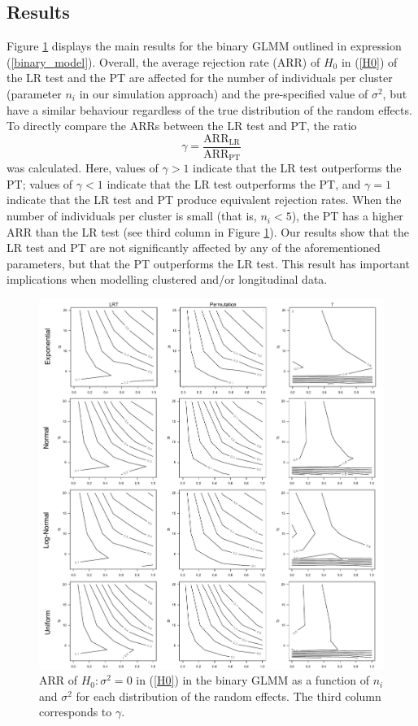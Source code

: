 \documentclass{sciposter}
\begin{document}
\begin{boldmath}
\begin{multicols}{3}
\section{Results}
Figure \ref{results} displays the main results for the binary GLMM outlined in expression (\ref{binary_model}). Overall, the average rejection rate (ARR) of $H_0$ in (\ref{H0}) of the LR test and the PT are affected for the number of individuals per cluster (parameter $n_i$ in our simulation approach) and the pre-specified value of $\sigma^2$, but have a similar behaviour regardless of the true distribution of the random effects. To directly compare the ARRs between the LR test and PT, the ratio
\begin{equation}
\gamma=\frac{\text{ARR}_{\text{LR}}}{\text{ARR}_{\text{PT}}}
\end{equation}
was calculated.  Here, values of $\gamma>1$ indicate that the LR test outperforms the PT; values of $\gamma<1$ indicate that the LR test outperforms the PT, and $\gamma=1$ indicate that the LR test and PT produce equivalent rejection rates. When the number of individuals per cluster is small (that is, $n_i<5$), the PT has a higher ARR than the LR test (see third column in Figure \ref{results}). Our results show that the LR test and PT are not significantly affected by any of the aforementioned parameters, but that the PT outperforms the LR test. This result has important implications when modelling clustered and/or longitudinal data.

\begin{figure}[htb]
  \centering
  \includegraphics[scale=1.24]{resbinary.pdf}
  \caption{ARR of $H_0:\sigma^2=0$ in (\ref{H0}) in the binary GLMM as  a function of $n_i$ and $\sigma^2$ for each distribution of the random effects.  The third column corresponds to $\gamma$.}\label{results}
\end{figure}

\end{multicols}
\end{boldmath}
\end{document}
